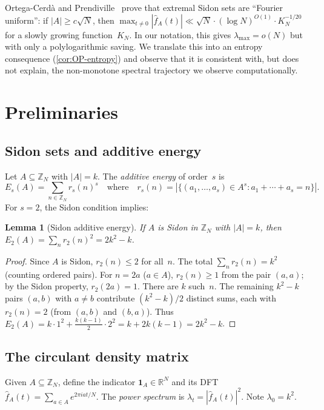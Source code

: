 \documentclass[11pt]{article}
\newtheorem{lemma}[theorem]{Lemma}
\theoremstyle{definition}
\theoremstyle{remark}
\newcommand{\Z}{\mathbb{Z}}
\newcommand{\R}{\mathbb{R}}
\newcommand{\fhat}{\widehat{f}}
\newcommand{\lmax}{\lambda_{\max}}
\begin{document}
Ortega-Cerd\`a and Prendiville~\cite{OP2021} prove that extremal Sidon
sets are ``Fourier uniform'': if $|A| \ge c\sqrt{N}$, then
$\max_{t \ne 0} |\fhat_A(t)| \ll
\sqrt{N} \cdot (\log N)^{O(1)} \cdot K_N^{-1/20}$
for a slowly growing function~$K_N$.  In our notation, this gives
$\lmax = o(N)$ but with only a polylogarithmic saving.  We translate
this into an entropy consequence (\cref{cor:OP-entropy}) and observe
that it is consistent with, but does not explain, the non-monotone
spectral trajectory we observe computationally.

\section{Preliminaries}\label{sec:prelim}

\subsection{Sidon sets and additive energy}

Let $A \subseteq \Z_N$ with $|A| = k$.  The \emph{additive energy}
of order~$s$ is
\[
  E_s(A) = \sum_{n \in \Z_N} r_s(n)^s
  \quad\text{where}\quad
  r_s(n) = |\{(a_1,\ldots,a_s) \in A^s : a_1 + \cdots + a_s = n\}|.
\]
For $s = 2$, the Sidon condition implies:

\begin{lemma}[Sidon additive energy]\label{lem:sidon-energy}
If $A$ is Sidon in $\Z_N$ with $|A| = k$, then
$E_2(A) = \sum_n r_2(n)^2 = 2k^2 - k$.
\end{lemma}

\begin{proof}
Since $A$ is Sidon, $r_2(n) \le 2$ for all~$n$.
The total $\sum_n r_2(n) = k^2$ (counting ordered pairs).
For $n = 2a$ ($a \in A$), $r_2(n) \ge 1$ from the pair $(a,a)$;
by the Sidon property, $r_2(2a) = 1$.  There are $k$ such~$n$.
The remaining $k^2 - k$ pairs $(a,b)$ with $a \ne b$ contribute
$(k^2-k)/2$ distinct sums, each with $r_2(n) = 2$ (from $(a,b)$
and $(b,a)$).
Thus $E_2(A) = k \cdot 1^2 + \tfrac{k(k-1)}{2} \cdot 2^2
= k + 2k(k-1) = 2k^2 - k$.
\end{proof}

\subsection{The circulant density matrix}

Given $A \subseteq \Z_N$, define the indicator
$\mathbf{1}_A \in \R^N$ and its DFT
$\fhat_A(t) = \sum_{a \in A} e^{2\pi i a t / N}$.
The \emph{power spectrum} is $\lambda_t = |\fhat_A(t)|^2$.
Note $\lambda_0 = k^2$.
\end{document}
